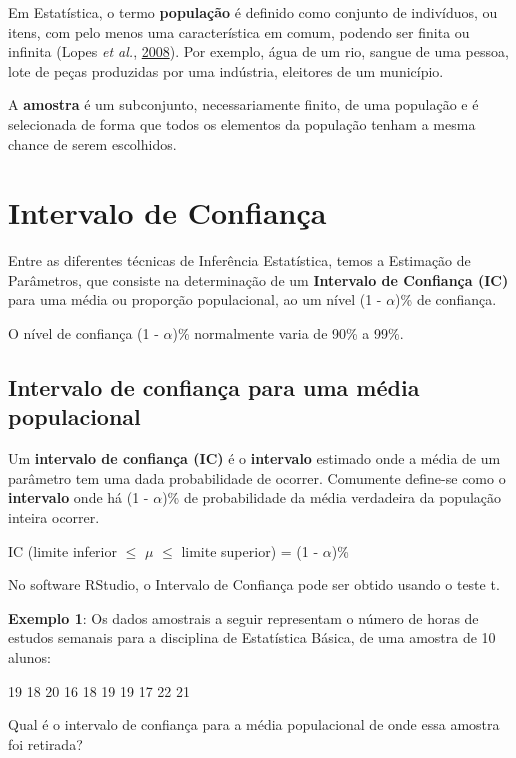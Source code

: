 \documentclass[12pt,brazil,oneside]{book}
\begin{document}
Em Estatística, o termo \textbf{população} é definido como conjunto de indivíduos, ou itens, com pelo menos uma característica em comum, podendo ser finita ou infinita (Lopes \emph{et al.}, \protect\hyperlink{ref-lopes2008}{2008}). Por exemplo, água de um rio, sangue de uma pessoa, lote de peças produzidas por uma indústria, eleitores de um município.

A \textbf{amostra} é um subconjunto, necessariamente finito, de uma população e é selecionada de forma que todos os elementos da população tenham a mesma chance de serem escolhidos.

\hypertarget{intervalo-de-confianca}{%
\section{Intervalo de Confiança}\label{intervalo-de-confianca}}

Entre as diferentes técnicas de Inferência Estatística, temos a Estimação de Parâmetros, que consiste na determinação de um \textbf{Intervalo de Confiança (IC)} para uma média ou proporção populacional, ao um nível (1 - \(\alpha\))\% de confiança.

O nível de confiança (1 - \(\alpha\))\% normalmente varia de 90\% a 99\%.

\hypertarget{intervalo-de-confianca-para-uma-media-populacional}{%
\subsection{Intervalo de confiança para uma média populacional}\label{intervalo-de-confianca-para-uma-media-populacional}}

Um \textbf{intervalo de confiança (IC)} é o \textbf{intervalo} estimado onde a média de um parâmetro tem uma dada probabilidade de ocorrer. Comumente define-se como o \textbf{intervalo} onde há (1 - \(\alpha\))\% de probabilidade da média verdadeira da população inteira ocorrer.

IC (limite inferior \(\leq\) \(\mu\) \(\leq\) limite superior) = (1 - \(\alpha\))\%

No software RStudio, o Intervalo de Confiança pode ser obtido usando o teste t.

\textbf{Exemplo 1}: Os dados amostrais a seguir representam o número de horas de estudos semanais para a disciplina de Estatística Básica, de uma amostra de 10 alunos:

19 18 20 16 18 19 19 17 22 21

Qual é o intervalo de confiança para a média populacional de onde essa amostra foi retirada?
\end{document}
